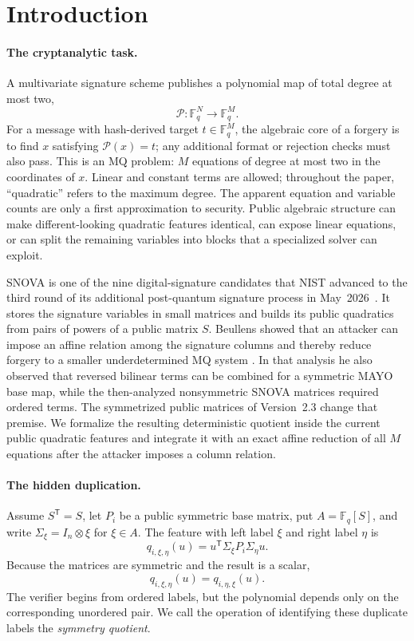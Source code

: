 \documentclass[11pt]{article}
\newcommand{\F}{\mathbb F}
\newcommand{\transpose}{\mathsf T}
\newcommand{\SNOVA}{\textsf{SNOVA}}
\begin{document}
\section{Introduction}\label{sec:intro}

\paragraph{The cryptanalytic task.}
A multivariate signature scheme publishes a polynomial map of total degree
at most two,
\[
  \mathcal P:\F_q^{N}\longrightarrow\F_q^{M}.
\]
For a message with hash-derived target $t\in\F_q^M$, the algebraic core of a
forgery is to find $x$ satisfying $\mathcal P(x)=t$; any additional format or
rejection checks must also pass.  This is an MQ problem: $M$ equations of
degree at most two in the coordinates of $x$.  Linear and constant terms are
allowed; throughout the paper, ``quadratic'' refers to the maximum degree.
The apparent equation and variable counts are only a first approximation to
security.  Public algebraic structure can make different-looking quadratic
features identical, can expose linear equations, or can split the remaining
variables into blocks that a specialized solver can exploit.

\SNOVA{} is one of the nine digital-signature candidates that NIST advanced to
the third round of its additional post-quantum signature process in
May~2026~\cite{NISTThirdRound2026}.  It stores the signature variables in small
matrices and builds its public quadratics from pairs of powers of a public
matrix $S$.  Beullens showed that an attacker can impose an affine relation
among the signature columns and thereby reduce forgery to a smaller
underdetermined MQ system \cite{Beullens2024SNOVA}.  In that analysis he also
observed that reversed bilinear terms can be combined for a symmetric MAYO
base map, while the then-analyzed nonsymmetric \SNOVA{} matrices required
ordered terms.  The symmetrized public matrices of Version~2.3 change that
premise.  We formalize the resulting deterministic quotient inside the
current public quadratic features and integrate it with an exact affine
reduction of all $M$ equations after the attacker imposes a column relation.

\paragraph{The hidden duplication.}
Assume $S^\transpose=S$, let $P_i$ be a public symmetric base matrix, put
$A=\F_q[S]$, and write $\Sigma_\xi=I_n\otimes\xi$ for $\xi\in A$.  The feature
with left label $\xi$ and right label $\eta$ is
\[
  q_{i,\xi,\eta}(u)
  =u^\transpose\Sigma_\xi P_i\Sigma_\eta u.
\]
Because the matrices are symmetric and the result is a scalar,
\begin{equation}\label{eq:intro-swap}
  q_{i,\xi,\eta}(u)=q_{i,\eta,\xi}(u).
\end{equation}
The verifier begins from ordered labels, but the polynomial depends only on
the corresponding unordered pair.  We call the operation of identifying
these duplicate labels the \emph{symmetry quotient}.
\end{document}
